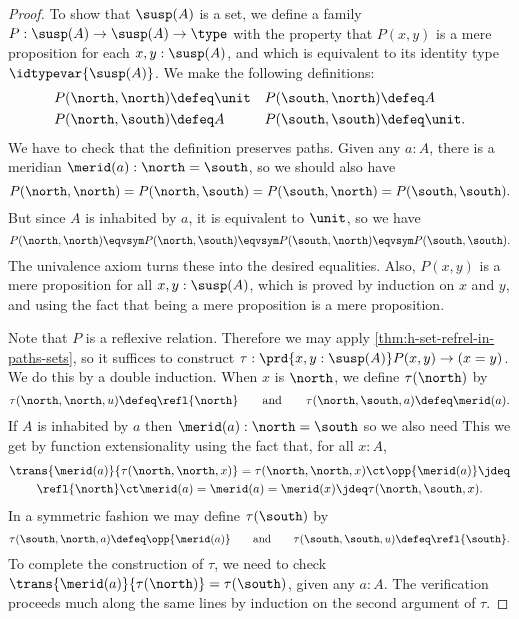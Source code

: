 \begin{proof}
To show that $\susp(A)$ is a set, we define a
family $P:\susp(A)\to\susp(A)\to\type$ with the
property that $P(x,y)$ is a mere proposition for each $x,y:\susp(A)$,
and which is equivalent to its identity type $\idtypevar{\susp(A)}$.
%
We make the following definitions:
\begin{align*}
P(\north,\north) & \defeq \unit &
P(\south,\north) & \defeq A\\
P(\north,\south) & \defeq A &
P(\south,\south) & \defeq \unit.
\end{align*}
We have to check that the definition preserves paths.
Given any $a : A$, there is a meridian $\merid(a) : \north = \south$,
so we should also have
%
\begin{equation*}
  P(\north, \north) = P(\north, \south) = P(\south, \north) = P(\south, \south).
\end{equation*}
%
But since $A$ is inhabited by $a$, it is equivalent to $\unit$, so we have
%
\begin{equation*}
  P(\north, \north) \eqvsym P(\north, \south) \eqvsym P(\south, \north) \eqvsym P(\south, \south).
\end{equation*}
%
The univalence axiom turns these into the desired equalities. Also, $P(x,y)$ is a mere
proposition for all $x, y : \susp(A)$, which is proved by induction on $x$ and $y$, and
using the fact that being a mere proposition is a mere proposition.

Note that $P$ is a reflexive relation.
Therefore we may apply \cref{thm:h-set-refrel-in-paths-sets}, so it suffices to
construct $\tau : \prd{x,y:\susp(A)}P(x,y)\to(x=y)$. We do this by a double induction.
When $x$ is $\north$, we define $\tau(\north)$ by
%
\begin{equation*}
  \tau(\north,\north,u) \defeq \refl{\north}
  \qquad\text{and}\qquad
  \tau(\north,\south,a) \defeq \merid(a).
\end{equation*}
%
If $A$ is inhabited by $a$ then $\merid(a) : \north = \south$ so we also need
This we get by function extensionality using the fact that, for all $x : A$,
%
\begin{multline*}
  \trans{\merid(a)}{\tau(\north,\north,x)} =
  \tau(\north,\north,x) \ct \opp{\merid(a)} \jdeq \\
  \refl{\north} \ct \merid(a) =
  \merid(a) =
  \merid(x) \jdeq
  \tau(\north, \south, x).
\end{multline*}
In a symmetric fashion we may define $\tau(\south)$ by
%
\begin{equation*}
  \tau(\south,\north, a) \defeq \opp{\merid(a)}
  \qquad\text{and}\qquad
  \tau(\south,\south, u) \defeq \refl{\south}.
\end{equation*}
%
To complete the construction of $\tau$, we need to check $\trans{\merid(a)}{\tau(\north)} = \tau(\south)$,
given any $a : A$. The verification proceeds much along the same lines by induction on the
second argument of $\tau$.


\end{proof}
